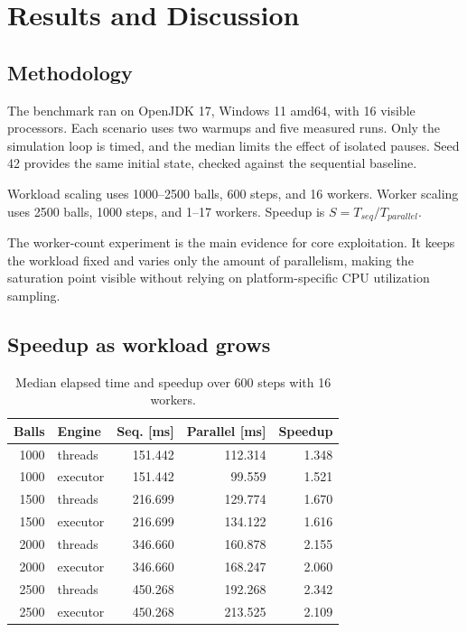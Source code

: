 \clearpage
\section{Results and Discussion}

\subsection{Methodology}

The benchmark ran on OpenJDK 17, Windows 11 amd64, with 16 visible processors.
Each scenario uses two warmups and five measured runs. Only the simulation loop
is timed, and the median limits the effect of isolated pauses. Seed 42 provides
the same initial state, checked against the sequential baseline.

Workload scaling uses 1000--2500 balls, 600 steps, and 16 workers. Worker
scaling uses 2500 balls, 1000 steps, and 1--17 workers. Speedup is
$S=T_{seq}/T_{parallel}$.

The worker-count experiment is the main evidence for core exploitation. It
keeps the workload fixed and varies only the amount of parallelism, making the
saturation point visible without relying on platform-specific CPU utilization
sampling.

\subsection{Speedup as workload grows}

\begin{table}[htbp]
    \centering
    \small
    \setlength{\tabcolsep}{5pt}
    \begin{tabular}{rlrrr}
        \hline
        Balls & Engine & Seq. [ms] & Parallel [ms] & Speedup \\
        \hline
        1000 & threads  & 151.442 & 112.314 & 1.348 \\
        1000 & executor & 151.442 &  99.559 & 1.521 \\
        1500 & threads  & 216.699 & 129.774 & 1.670 \\
        1500 & executor & 216.699 & 134.122 & 1.616 \\
        2000 & threads  & 346.660 & 160.878 & 2.155 \\
        2000 & executor & 346.660 & 168.247 & 2.060 \\
        2500 & threads  & 450.268 & 192.268 & 2.342 \\
        2500 & executor & 450.268 & 213.525 & 2.109 \\
        \hline
    \end{tabular}
    \caption{Median elapsed time and speedup over 600 steps with 16 workers.}
    \label{tab:workload-speedup}
\end{table}

